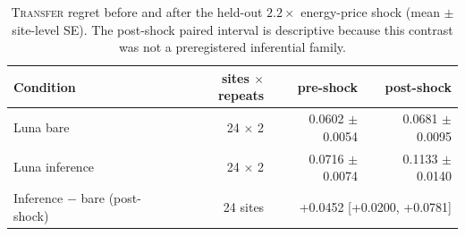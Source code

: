 \begin{table}[t]
\centering\small
\begin{tabular}{@{}lrrr@{}}
\toprule
Condition & sites $\times$ repeats & pre-shock & post-shock \\
\midrule
Luna bare & 24 $\times$ 2 & 0.0602 $\pm$ 0.0054 & 0.0681 $\pm$ 0.0095 \\
Luna inference & 24 $\times$ 2 & 0.0716 $\pm$ 0.0074 & 0.1133 $\pm$ 0.0140 \\
\midrule
Inference $-$ bare (post-shock) & 24 sites & \multicolumn{2}{r}{+0.0452 [+0.0200, +0.0781]} \\
\bottomrule
\end{tabular}
\caption{\textsc{Transfer} regret before and after the held-out $2.2\times$ energy-price shock (mean $\pm$ site-level SE). The post-shock paired interval is descriptive because this contrast was not a preregistered inferential family.}
\label{tab:transfer-v2}
\end{table}
